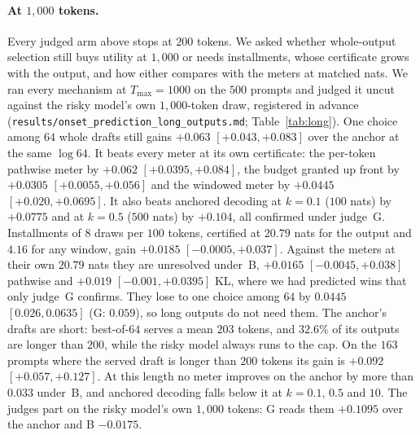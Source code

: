 \paragraph{At $1{,}000$ tokens.}\label{app:long}
Every judged arm above stops at $200$ tokens. We asked whether whole-output selection still buys utility at
$1{,}000$ or needs installments, whose certificate grows with the output, and how either compares with the
meters at matched nats. We ran every mechanism at $T_{\max} = 1000$ on the $500$ prompts and judged it
uncut against the risky model's own $1{,}000$-token draw, registered in advance
(\texttt{results/\allowbreak onset\_\allowbreak prediction\_\allowbreak long\_\allowbreak outputs.md};
Table~\ref{tab:long}). One choice among $64$ whole drafts still gains $+0.063$ $[+0.043, +0.083]$ over the
anchor at the same $\log 64$. It beats every meter at its own certificate: the per-token pathwise meter by
$+0.062$ $[+0.0395, +0.084]$, the budget granted up front by $+0.0305$ $[+0.0055, +0.056]$ and the windowed
meter by $+0.0445$ $[+0.020, +0.0695]$. It also beats anchored decoding at $k=0.1$ ($100$ nats) by
$+0.0775$ and at $k=0.5$ ($500$ nats) by $+0.104$, all confirmed under judge~G. Installments of $8$ draws
per $100$ tokens, certified at $20.79$ nats for the output and $4.16$ for any window, gain $+0.0185$
$[-0.0005, +0.037]$. Against the meters at their own $20.79$ nats they are unresolved under~B, $+0.0165$
$[-0.0045, +0.038]$ pathwise and $+0.019$ $[-0.001, +0.0395]$ KL, where we had predicted wins that only
judge~G confirms. They lose to one choice among $64$ by $0.0445$ $[0.026, 0.0635]$ (G: $0.059$), so long
outputs do not need them. The anchor's drafts are short: best-of-$64$ serves a mean $203$ tokens, and
$32.6\%$ of its outputs are longer than $200$, while the risky model always runs to the cap. On the $163$
prompts where the served draft is longer than $200$ tokens its gain is $+0.092$ $[+0.057, +0.127]$. At
this length no meter improves on the anchor by more than $0.033$ under~B, and anchored decoding falls
below it at $k = 0.1$, $0.5$ and $10$. The judges part on the risky model's own $1{,}000$ tokens: G reads
them $+0.1095$ over the anchor and B $-0.0175$.

